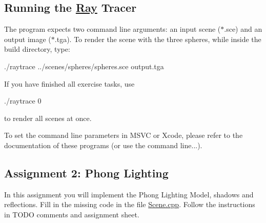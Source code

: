 \subsection*{Running the \hyperlink{classRay}{Ray} Tracer }

The program expects two command line arguments\+: an input scene ({\ttfamily $\ast$.sce}) and an output image ({\ttfamily $\ast$.tga}). To render the scene with the three spheres, while inside the {\ttfamily build} directory, type\+: \begin{DoxyVerb}./raytrace ../scenes/spheres/spheres.sce output.tga
\end{DoxyVerb}


If you have finished all exercise tasks, use \begin{DoxyVerb}./raytrace 0
\end{DoxyVerb}


to render all scenes at once.

To set the command line parameters in M\+S\+VC or Xcode, please refer to the documentation of these programs (or use the command line...).

\subsection*{Assignment 2\+: Phong Lighting }

In this assignment you will implement the Phong Lighting Model, shadows and reflections. Fill in the missing code in the file \hyperlink{Scene_8cpp}{Scene.\+cpp}. Follow the instructions in T\+O\+DO comments and assignment sheet. 